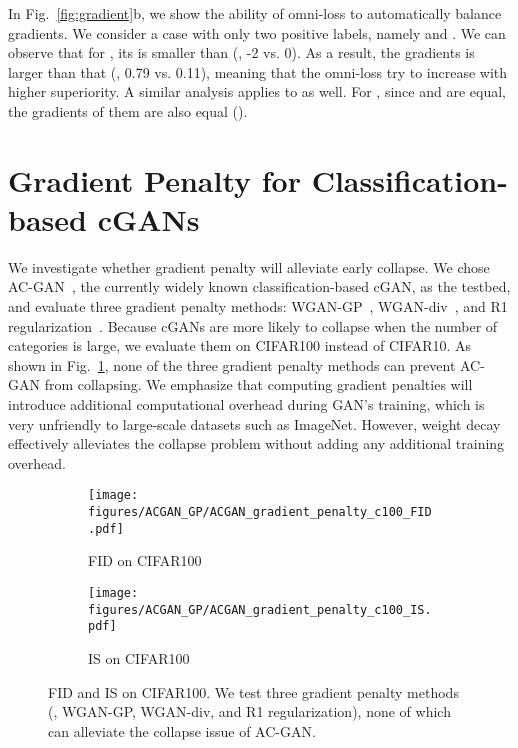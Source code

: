 \documentclass[paper_2425.tex]{subfiles}
\begin{document}
In Fig.~\ref{fig:gradient}b, we show the ability of omni-loss to automatically balance gradients. We consider a case with only two positive labels, namely  and . We can observe that for , its  is smaller than  (\ie, -2 vs. 0). As a result, the gradients \wrt  is larger than that \wrt  (\ie, 0.79 vs. 0.11), meaning that the omni-loss try to increase  with higher superiority. A similar analysis applies to  as well. For , since  and  are equal, the gradients of them are also equal ().


\section{Gradient Penalty for Classification-based cGANs}
\label{apx:sec:gp}

We investigate whether gradient penalty will alleviate early collapse. We chose AC-GAN~\cite{odena2017Conditional}, the currently widely known classification-based cGAN, as the testbed, and evaluate three gradient penalty methods: WGAN-GP~\cite{gulrajani2017Improved}, WGAN-div~\cite{mescheder2018Which}, and R1 regularization~\cite{wu2018Wasserstein}. Because cGANs are more likely to collapse when the number of categories is large, we evaluate them on CIFAR100 instead of CIFAR10. As shown in Fig.~\ref{apx:fig:acgan_gp}, none of the three gradient penalty methods can prevent AC-GAN from collapsing. We emphasize that computing gradient penalties will introduce additional computational overhead during GAN's training, which is very unfriendly to large-scale datasets such as ImageNet. However, weight decay effectively alleviates the collapse problem without adding any additional training overhead.


\begin{figure}[t]
\centering
  \begin{subfigure}{0.49\linewidth}
    \centering
    \texttt{[image: figures/ACGAN\_GP/ACGAN\_gradient\_penalty\_c100\_FID.pdf]}
    \caption{FID on CIFAR100}
  \end{subfigure}
  \begin{subfigure}{0.49\linewidth}
    \centering
    \texttt{[image: figures/ACGAN\_GP/ACGAN\_gradient\_penalty\_c100\_IS.pdf]}
    \caption{IS on CIFAR100}
  \end{subfigure}
  \vspace{-0.2cm}
  \caption{FID and IS on CIFAR100. We test three gradient penalty methods (\ie, WGAN-GP, WGAN-div, and R1 regularization), none of which can alleviate the collapse issue of AC-GAN.}
  \label{apx:fig:acgan_gp}
\end{figure}
\end{document}
